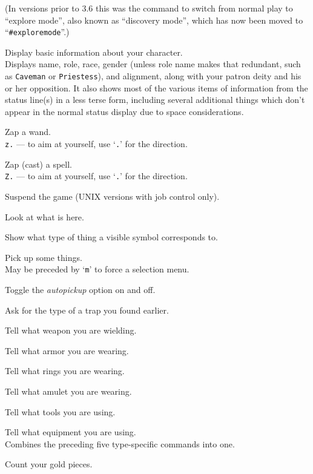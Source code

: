 (In versions prior to 3.6 this was the command to switch from normal
play to ``explore mode'', also known as ``discovery mode'', which has now
been moved to ``{\tt \#exploremode}''.)
\item[\tb{\^{}X}]
Display basic information about your character.\\
Displays name, role, race, gender (unless role name makes that
redundant, such as {\tt Caveman} or {\tt Priestess}), and alignment,
along with your patron deity and his or her opposition.  It also
shows most of the various items of information from the status line(s)
in a less terse form, including several additional things which don't
appear in the normal status display due to space considerations.
\item[\tb{z}]
Zap a wand.\\
{\tt z.} --- to aim at yourself, use `{\tt .}' for the direction.
\item[\tb{Z}]
Zap (cast) a spell.\\
{\tt Z.} --- to aim at yourself, use `{\tt .}' for the direction.
\item[\tb{\^{}Z}]
Suspend the game (UNIX versions with job control only).
\item[\tb{:}]
Look at what is here.
\item[\tb{;}]
Show what type of thing a visible symbol corresponds to.
\item[\tb{,}]
Pick up some things.\\
May be preceded by `{\tt m}' to force a selection menu.
\item[\tb{@}]
Toggle the {\it autopickup\/} option on and off.
\item[\tb{\^{}}]
Ask for the type of a trap you found earlier.
\item[\tb{)}]
Tell what weapon you are wielding.
\item[\tb{[}]
Tell what armor you are wearing.
\item[\tb{=}]
Tell what rings you are wearing.
\item[\tb{"}]
Tell what amulet you are wearing.
\item[\tb{(}]
Tell what tools you are using.
\item[\tb{*}]
Tell what equipment you are using.\\
Combines the preceding five type-specific
commands into one.
\item[\tb{\$}]
Count your gold pieces.
